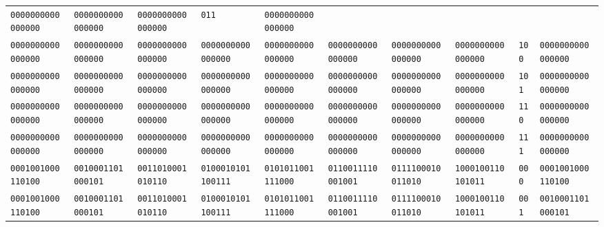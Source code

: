 \documentclass[12pt]{article}
\begin{document}
\begin{table}[H]
{\begin{tabular}{@{}llllllllll@{}}
          \texttt{0000000000000000} &
          \texttt{0000000000000000} &
          \texttt{0000000000000000} &
          \texttt{011} &
          \texttt{0000000000000000} \\
        \texttt{0000000000000000} &
          \texttt{0000000000000000} &
          \texttt{0000000000000000} &
          \texttt{0000000000000000} &
          \texttt{0000000000000000} &
          \texttt{0000000000000000} &
          \texttt{0000000000000000} &
          \texttt{0000000000000000} &
          \texttt{100} &
          \texttt{0000000000000000} \\
        \texttt{0000000000000000} &
          \texttt{0000000000000000} &
          \texttt{0000000000000000} &
          \texttt{0000000000000000} &
          \texttt{0000000000000000} &
          \texttt{0000000000000000} &
          \texttt{0000000000000000} &
          \texttt{0000000000000000} &
          \texttt{101} &
          \texttt{0000000000000000} \\
        \texttt{0000000000000000} &
          \texttt{0000000000000000} &
          \texttt{0000000000000000} &
          \texttt{0000000000000000} &
          \texttt{0000000000000000} &
          \texttt{0000000000000000} &
          \texttt{0000000000000000} &
          \texttt{0000000000000000} &
          \texttt{110} &
          \texttt{0000000000000000} \\
        \texttt{0000000000000000} &
          \texttt{0000000000000000} &
          \texttt{0000000000000000} &
          \texttt{0000000000000000} &
          \texttt{0000000000000000} &
          \texttt{0000000000000000} &
          \texttt{0000000000000000} &
          \texttt{0000000000000000} &
          \texttt{111} &
          \texttt{0000000000000000} \\
        \texttt{0001001000110100} &
          \texttt{0010001101000101} &
          \texttt{0011010001010110} &
          \texttt{0100010101100111} &
          \texttt{0101011001111000} &
          \texttt{0110011110001001} &
          \texttt{0111100010011010} &
          \texttt{1000100110101011} &
          \texttt{000} &
          \texttt{0001001000110100} \\
        \texttt{0001001000110100} &
          \texttt{0010001101000101} &
          \texttt{0011010001010110} &
          \texttt{0100010101100111} &
          \texttt{0101011001111000} &
          \texttt{0110011110001001} &
          \texttt{0111100010011010} &
          \texttt{1000100110101011} &
          \texttt{001} &
          \texttt{0010001101000101} \\

\end{tabular}}
\end{table}
\end{document}
